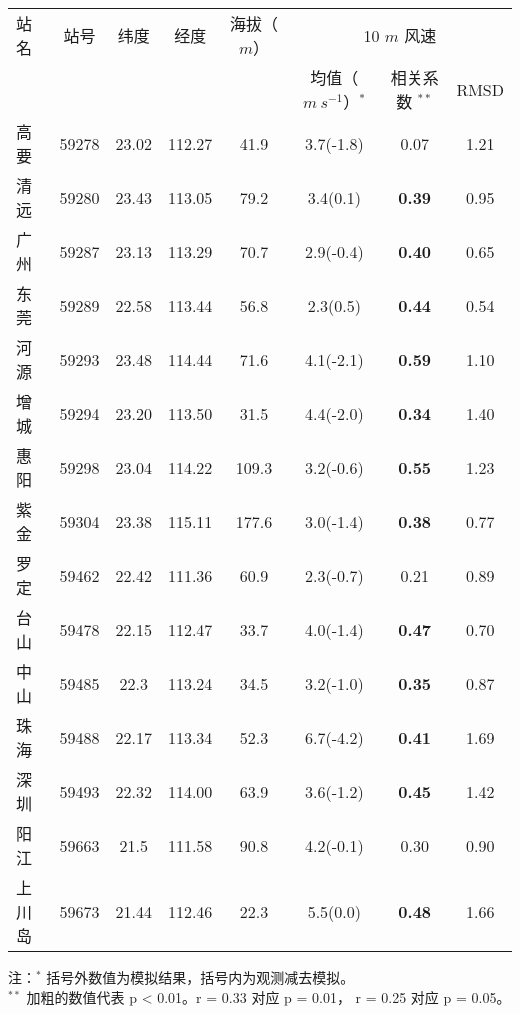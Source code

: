 \begin{table}[!htbp]
    \label{tab:PRDsiteinfo}
    \centering
    \small%
    \setlength{\tabcolsep}{5 pt}%
    \renewcommand{\arraystretch}{1.0}%
    \begin{tabular}{lccccccc}
        \hline
        站名 & 站号 & 纬度 & 经度 & 海拔（$m$）&  \multicolumn{3}{c}{10 $m$ 风速} \\
         & & & & & 均值（$m ~ s^{-1}$）$^*$ &  相关系数 $^ {**}$ & RMSD \\
        \hline
        高要 & 59278 & 23.02 & 112.27 & 41.9 & 3.7(-1.8) & 0.07 & 1.21 \\
        清远 & 59280 & 23.43 & 113.05 & 79.2 & 3.4(0.1) & \textbf{0.39} & 0.95 \\
        广州 & 59287 & 23.13 & 113.29 & 70.7 & 2.9(-0.4) & \textbf{0.40} & 0.65 \\
        东莞 & 59289 & 22.58 & 113.44 & 56.8 & 2.3(0.5) & \textbf{0.44} & 0.54 \\
        河源 & 59293 & 23.48 & 114.44 & 71.6 & 4.1(-2.1) & \textbf{0.59} & 1.10 \\
        增城 & 59294 & 23.20 & 113.50 & 31.5 & 4.4(-2.0) & \textbf{0.34} & 1.40 \\
        惠阳 & 59298 & 23.04 & 114.22 & 109.3 & 3.2(-0.6) & \textbf{0.55} & 1.23 \\
	   紫金 & 59304 & 23.38 & 115.11 & 177.6 & 3.0(-1.4) & \textbf{0.38} & 0.77 \\
	   罗定 & 59462 & 22.42 & 111.36 & 60.9 & 2.3(-0.7) & 0.21 & 0.89 \\
	   台山 & 59478 & 22.15 & 112.47 & 33.7 & 4.0(-1.4) & \textbf{0.47} & 0.70 \\
	   中山 & 59485 & 22.3 & 113.24 & 34.5 & 3.2(-1.0) & \textbf{0.35} & 0.87 \\
	   珠海 & 59488 & 22.17 & 113.34 & 52.3 & 6.7(-4.2) & \textbf{0.41} & 1.69\\
	   深圳 & 59493 & 22.32 & 114.00 & 63.9 & 3.6(-1.2) & \textbf{0.45} & 1.42 \\
	   阳江 & 59663 & 21.5 & 111.58 & 90.8 & 4.2(-0.1) & 0.30 & 0.90 \\
	   上川岛 & 59673 & 21.44 & 112.46 & 22.3 & 5.5(0.0) & \textbf{0.48} & 1.66 \\    
        \hline
    \end{tabular}
    
     \vspace*{3ex}
     
    \begin{minipage}{0.9\textwidth}%
    注：$^*$ 括号外数值为模拟结果，括号内为观测减去模拟。\\ 
    $^{**}$ 加粗的数值代表 p < 0.01。r = 0.33 对应 p = 0.01， r = 0.25 对应 p = 0.05。
    \end{minipage}
\end{table}

